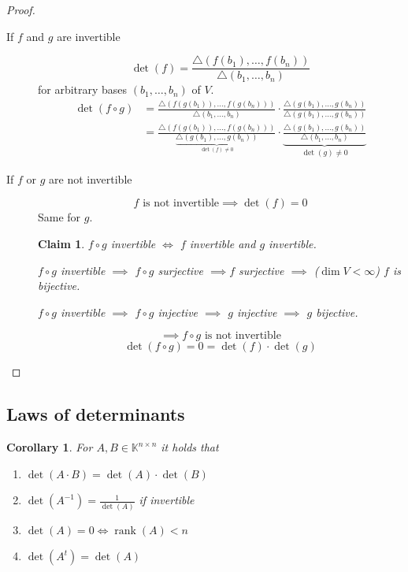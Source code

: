 \documentclass{article}
\newcounter{lecref}[section]
\numberwithin{lecref}{section}
\newtheorem*{claim}{Claim}
\newtheorem{corollary}[lecref]{Corollary}
\DeclareMathOperator{\rank}{rank}
\begin{document}
\begin{proof}
  \begin{description}
    \item[If $f$ and $g$ are invertible] 
      \[ \det(f) = \frac{\triangle (f(b_1), \dots, f(b_n))}{\triangle(b_1, \dots, b_n)} \]
      for arbitrary bases $(b_1, \dots, b_n)$ of $V$.
      \begin{align*}
        \det(f \circ g) &= \frac{\triangle(f(g(b_1)), \dots, f(g(b_n)))}{\triangle(b_1, \dots, b_n)} \cdot \frac{\triangle(g(b_1), \dots, g(b_n))}{\triangle(g(b_1), \dots, g(b_n))} \\
          &= \frac{\triangle(f(g(b_1)), \dots, f(g(b_n)))}{\underbrace{\triangle(g(b_1), \dots, g(b_n))}_{\det(f) \neq 0}} \cdot \underbrace{\frac{\triangle(g(b_1), \dots, g(b_n))}{\triangle(b_1, \dots, b_n)}}_{\det(g) \neq 0}
      \end{align*}
    \item[If $f$ or $g$ are not invertible]
      \[ f \text{ is not invertible} \implies \det(f) = 0 \]
      Same for $g$.

      \begin{claim}
        $f \circ g$ invertible $\iff$ $f$ invertible and $g$ invertible.

        $f \circ g$ invertible $\implies$ $f \circ g$ surjective $\implies f$ surjective $\implies$ ($\dim{V} < \infty$) $f$ is bijective.

        $f \circ g$ invertible $\implies$ $f \circ g$ injective $\implies$ $g$ injective $\implies$ $g$ bijective.
      \end{claim}

      \[ \implies f \circ g \text{ is not invertible} \]
      \[ \det(f \circ g) = 0 = \det(f) \cdot \det(g) \]
  \end{description}
\end{proof}

\subsection{Laws of determinants}

\begin{corollary} %
  \label{cor730}
  For $A, B \in \mathbb K^{n\times n}$ it holds that
  \begin{enumerate}
    \item $\det(A \cdot B) = \det(A) \cdot \det(B)$
    \item $\det(A^{-1}) = \frac{1}{\det(A)}$ if invertible
    \item $\det(A) = 0 \iff \rank(A) < n$
    \item $\det(A^t) = \det(A)$
  \end{enumerate}
\end{corollary}
\end{document}
